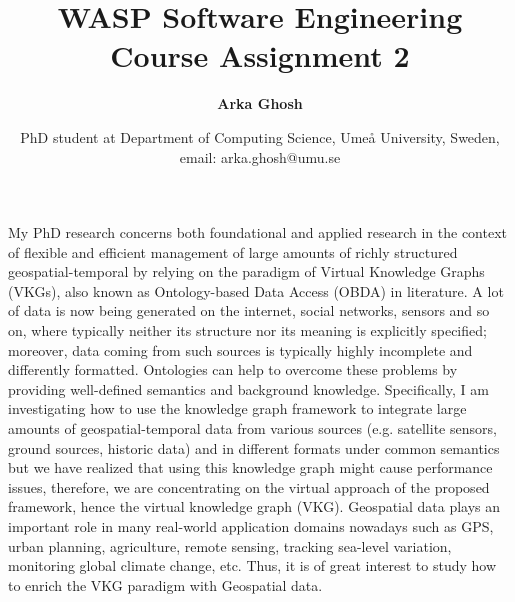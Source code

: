 \documentclass[10.9pt]{article}
\title{\textbf{WASP Software Engineering Course Assignment 2}}
\author{\textbf{Arka Ghosh}}
\date{PhD student at Department of Computing Science, Umeå University, Sweden, email: arka.ghosh@umu.se}
\begin{document}
\maketitle

My PhD research concerns both foundational and applied research in the context of flexible and efficient management of large amounts of richly structured geospatial-temporal by relying on the paradigm of Virtual Knowledge Graphs (VKGs), also known as Ontology-based Data Access (OBDA) in literature. A lot of data is now being generated on the internet, social networks, sensors and so on, where typically neither its structure nor its meaning is explicitly specified; moreover, data coming from such sources is typically highly incomplete and differently formatted. Ontologies can help to overcome these problems by providing well-defined semantics and background knowledge. Specifically, I am investigating how to use the knowledge graph framework to integrate large amounts of geospatial-temporal data from various sources (e.g. satellite sensors, ground sources, historic data) and in different formats under common semantics but we have realized that using this knowledge graph might cause performance issues, therefore, we are concentrating on the virtual approach of the proposed framework, hence the virtual knowledge graph (VKG). Geospatial data plays an important role in many real-world application domains nowadays such as GPS, urban planning, agriculture, remote sensing, tracking sea-level variation, monitoring global climate change, etc. Thus, it is of great interest to study how to enrich the VKG paradigm with Geospatial data.
\end{document}
